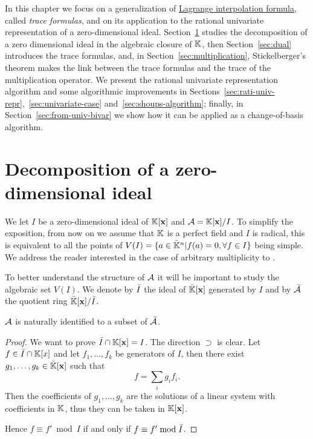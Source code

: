 In this chapter we focus on a generalization of
\hyperref[sec:chin-rema-algor]{Lagrange interpolation formula}, called
\emph{trace formulas}, and on its application to the rational
univariate representation of a zero-dimensional
ideal. Section~\ref{sec:decomp-zero-dimens} studies the decomposition
of a zero dimensional ideal in the algebraic closure of $\mathbb{K}$, then
Section~\ref{sec:dual} introduces the trace formulas, and, in
Section~\ref{sec:multiplication}, Stickelberger's theorem makes the
link between the trace formulas and the trace of the multiplication
operator. We present the rational univariate representation algorithm
and some algorithmic improvements in
Sections~\ref{sec:rati-univ-repr},~\ref{sec:univariate-case}
and~\ref{sec:shoups-algorithm}; finally, in
Section~\ref{sec:from-univ-bivar} we show how it can be applied as a
change-of-basis algorithm.


\section{Decomposition of a zero-dimensional ideal}
\label{sec:decomp-zero-dimens}

We let $I$ be a zero-dimensional ideal of $\mathbb{K}[\mathbf{x}]$ and
$\mathcal{A}=\mathbb{K}[\mathbf{x}]/I$.  To simplify the exposition, from now on we
assume that $\mathbb{K}$ is a perfect field and $I$ is radical, this is
equivalent to all the points of $V(I)=\{a\in\bar{\mathbb{K}}^n|f(a)=0,
\forall f\in I\}$ being simple. We address the reader interested in
the case of arbitrary multiplicity to \cite{mourrain+elkadi}.

To better understand the structure of $\mathcal{A}$ it will be important
to study the algebraic set $V(I)$. We denote by $\bar{I}$ the ideal of
$\bar{\mathbb{K}}[\mathbf{x}]$ generated by $I$ and by $\bar{\mathcal{A}}$ the
quotient ring $\bar{\mathbb{K}}[\mathbf{x}]/\bar{I}$.

\begin{lemma}
  $\mathcal{A}$ is naturally identified to a subset of $\bar{\mathcal{A}}$.
\end{lemma}
\begin{proof}
  We want to prove $\bar{I}\cap\mathbb{K}[\mathbf{x}]=I$. The direction
  $\supset$ is clear. Let $f\in\bar{I}\cap\mathbb{K}[x]$ and let
  $f_1,\ldots,f_k$ be generators of $I$, then there exist
  $g_1,\ldots,g_k\in\bar{\mathbb{K}}[\mathbf{x}]$ such that
  \begin{equation}
    \label{eq:114}
    f = \sum_i g_if_i
    \text{.}
  \end{equation}
  Then the coefficients of $g_1,\ldots,g_k$ are the solutions of a
  linear system with coefficients in $\mathbb{K}$, thus they can be taken in
  $\mathbb{K}[\mathbf{x}]$.

  Hence $f\equiv f'\bmod I$ if and only if $f\equiv f'\bmod\bar{I}$.
\end{proof}

